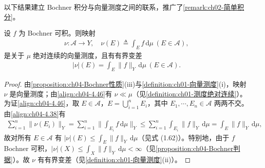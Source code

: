 \documentclass[../../main.tex]{subfiles}%
\begin{document}
以下结果建立 Bochner 积分与向量测度之间的联系，推广了\cref{remark:ch02-简单积分}。

\begin{proposition}\label{proposition:ch04-积分诱导向量测度}
设 $f$ 为 Bochner 可积。则映射
\begin{align}
\nu:\mathcal{A}\to Y,\quad \nu(E)\triangleq \int_E f\,\mathrm{d}\mu\ (E\in\mathcal{A}), \label{align:ch04-4.45}
\end{align}
是关于 $\mu$ 绝对连续的向量测度，且有有界变差
\begin{align}
|\nu|(E)=\int_E\|f\|_Y\,\mathrm{d}\mu\ (E\in\mathcal{A}). \label{align:ch04-4.46}
\end{align}
\end{proposition}

\begin{proof}
由\cref{proposition:ch04-Bochner性质}(iii)与\cref{definition:ch01-向量测度}(i)，映射 $\nu$ 是向量测度；由\eqref{align:ch04-4.46}有 $\nu\ll\mu$（见\cref{definition:ch01-测度绝对连续}）。为证\eqref{align:ch04-4.46}，取 $E\in\mathcal{A}$，$E=\bigcup_{i=1}^n E_i$，其中 $E_1,\cdots ,E_n\in\mathcal{A}$ 两两不交。由\eqref{align:ch04-4.38}有
\begin{align*}
\sum_{i=1}^n\|\nu(E_i)\|_Y=\sum_{i=1}^n\Big\|\int_{E_i}f\,\mathrm{d}\mu\Big\|_Y\leqslant\sum_{i=1}^n\int_{E_i}\|f\|_Y\,\mathrm{d}\mu=\int_E\|f\|_Y\,\mathrm{d}\mu,
\end{align*}
故对所有 $E\in\mathcal{A}$ 有 $|\nu|(E)\leqslant\int_E\|f\|_Y\,\mathrm{d}\mu$（见式 (1.62)）。特别地，由于 $f$ Bochner 可积，$|\nu|(X)\leqslant\int_X\|f\|_Y\,\mathrm{d}\mu<\infty$（见\cref{proposition:ch04-Bochner判据}）。故 $\nu$ 有有界变差（见\cref{definition:ch01-向量测度}(ii)）。


\end{proof}
\end{document}
